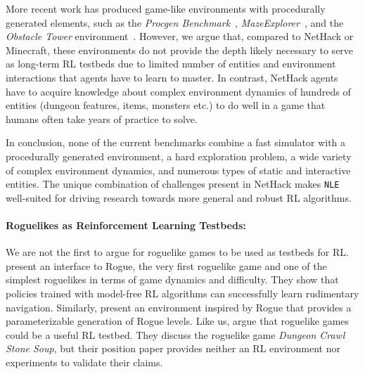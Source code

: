 \documentclass{article}
\newcommand{\nethack}{NetHack}
\newcommand{\NLE}{\texttt{NLE}}
\begin{document}
More recent work has produced game-like environments with procedurally
generated elements, such as the \emph{Procgen Benchmark}~\cite{cobbe2019procgen},
\emph{MazeExplorer}~\citep{harrieslee2019}, and the \emph{Obstacle
  Tower} environment~\citep{DBLP:conf/ijcai/JulianiKBHTHCTL19}.  However, we
argue that, compared to \nethack{} or Minecraft, these environments do
not provide the depth likely necessary to serve as long-term RL
testbeds due to limited number of entities and environment interactions that agents have to learn to master.
In contrast, \nethack{} agents have to acquire knowledge about complex environment dynamics of hundreds of entities (dungeon features, items, monsters etc.) to do well in a game that humans often take years of practice to solve.

In conclusion, none of the current benchmarks combine a fast simulator
with a procedurally generated environment, a hard exploration problem,
a wide variety of complex environment dynamics, and numerous types of
static and interactive entities. The unique combination of challenges
present in NetHack makes \NLE{} well-suited for driving research
towards more general and robust RL algorithms.


\paragraph{Roguelikes as Reinforcement Learning Testbeds:}
We are not the first to argue for roguelike games to be used as
testbeds for RL.
\citet{asperti2019crawling} present an interface to Rogue, the very
first roguelike game and one of the simplest roguelikes in terms of
game dynamics and difficulty. They show that policies trained with
model-free RL algorithms can successfully learn rudimentary
navigation.
Similarly, \citet{kanagawa2019rogue} present an environment inspired
by Rogue that provides a parameterizable generation of Rogue levels.
Like us, \citet{dannenhauer2019dungeon} argue that roguelike games
could be a useful RL testbed. They discuss the roguelike game
\emph{Dungeon Crawl Stone Soup}, but their position paper
provides neither an RL environment nor experiments to validate their claims.
\end{document}
